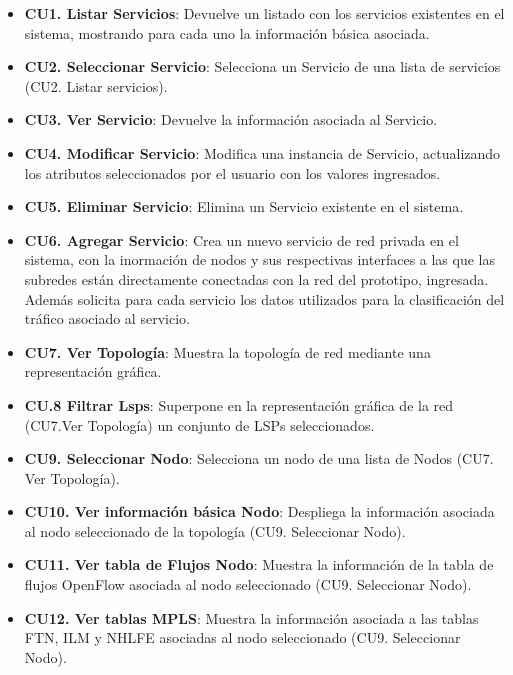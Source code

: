 \begin{itemize}
\item \textbf{CU1. Listar Servicios}: Devuelve un listado con los servicios existentes en el sistema, mostrando para cada uno la informaci\'on b\'asica asociada.

\item \textbf{CU2. Seleccionar Servicio}: Selecciona un Servicio de una lista de servicios (CU2. Listar servicios).

\item \textbf{CU3. Ver Servicio}: Devuelve la informaci\'on asociada al Servicio.

\item \textbf{CU4. Modificar Servicio}: Modifica una instancia de Servicio, actualizando los atributos seleccionados por el usuario con los valores ingresados.
 								
\item \textbf{CU5. Eliminar Servicio}: Elimina un Servicio existente en el sistema.

\item \textbf{CU6. Agregar Servicio}: Crea un nuevo servicio de red privada en el sistema, con la inormaci\'on de nodos y sus respectivas interfaces a las que las subredes est\'an directamente conectadas con la red del prototipo, ingresada. Adem\'as solicita para cada servicio los datos utilizados para la clasificaci\'on del tr\'afico asociado al servicio. 

\item \textbf{CU7. Ver Topolog\'ia}: Muestra la topolog\'ia de red mediante una representaci\'on gr\'afica.

\item \textbf{CU.8 Filtrar Lsps}: Superpone en la representaci\'on gr\'afica de la red (CU7.Ver Topolog\'ia) un conjunto de LSPs seleccionados.

\item \textbf{CU9. Seleccionar Nodo}: Selecciona un nodo de una lista de Nodos (CU7. Ver Topolog\'ia).

\item \textbf{CU10. Ver informaci\'on b\'asica Nodo}: Despliega la informaci\'on asociada al nodo seleccionado de la topolog\'ia (CU9. Seleccionar Nodo).

\item \textbf{CU11. Ver tabla de Flujos Nodo}: Muestra la informaci\'on de la tabla de flujos OpenFlow asociada al nodo seleccionado (CU9. Seleccionar Nodo).

\item \textbf{CU12. Ver tablas MPLS}: Muestra la informaci\'on asociada a las tablas FTN, ILM y NHLFE asociadas al nodo seleccionado (CU9. Seleccionar Nodo).


\end{itemize}
